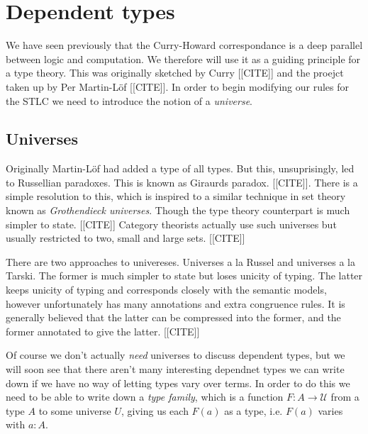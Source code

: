 \section{Dependent types}

We have seen previously that the Curry-Howard correspondance is a deep parallel between logic and computation. We therefore will use it as a guiding principle for a type theory. This was originally sketched by Curry [[CITE]] and the proejct taken up by Per Martin-L\"of [[CITE]]. In order to begin modifying our rules for the STLC we need to introduce the notion of a \emph{universe}.

\subsection{Universes}

Originally Martin-L\"of had added a type of all types. But this, unsuprisingly, led to Russellian paradoxes. This is known as Giraurds paradox. [[CITE]]. There is a simple resolution to this, which is inspired to a similar technique in set theory known as \emph{Grothendieck universes}. Though the type theory counterpart is much simpler to state. [[CITE]] Category theorists actually use such universes but usually restricted to two, small and large sets. [[CITE]]

There are two approaches to univereses. Universes a la Russel and universes a la Tarski. The former is much simpler to state but loses unicity of typing. The latter keeps unicity of typing and corresponds closely with the semantic models, however unfortunately has many annotations and extra congruence rules. It is generally believed that the latter can be compressed into the former, and the former annotated to give the latter. [[CITE]]

Of course we don't actually \emph{need} universes to discuss dependent types, but we will soon see that there aren't many interesting dependnet types we can write down if we have no way of letting types vary over terms. In order to do this we need to be able to write down a \emph{type family}, which is a function $F : A \to \mathcal{U}$ from a type $A$ to some universe $U$, giving us each $F(a)$ as a type, i.e. $F(a)$ varies with $a:A$.
